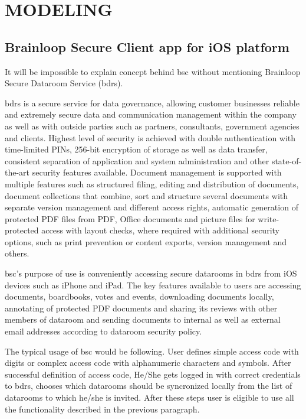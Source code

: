 \chapter{MODELING}
\label{chapter:modeling}


\section{Brainloop Secure Client app for iOS platform} 

\par
It will be impossible to explain concept behind \acrshort{bsc} without mentioning Brainloop Secure Dataroom Service (\acrshort{bdrs}). 

\par
\acrshort{bdrs} \cite{BDRS_Description} is a secure service for data governance, allowing customer businesses reliable and extremely secure data and communication management within the company as well as with outside parties such as partners, consultants, government agencies and clients. Highest level of security is achieved with double authentication with time-limited PINs, 256-bit encryption of storage as well as data transfer, consistent separation of application and system administration and other state-of-the-art security features available. Document management is supported with multiple features such as structured filing, editing and distribution of documents, document collections that combine, sort and structure several documents with separate version management and different access rights, automatic generation of protected PDF files from PDF, Office documents and picture files for write-protected access with layout checks, where required with additional security options, such as print prevention or content exports, version management and others.

\par
\acrshort{bsc}'s \cite{BSC_UserGuide} purpose of use is conveniently accessing secure datarooms in \acrshort{bdrs} from iOS devices such as iPhone and iPad. The key features available to users are accessing documents, boardbooks, votes and events, downloading documents locally, annotating of protected PDF documents and sharing its reviews with other members of dataroom and sending documents to internal as well as external email addresses according to dataroom security policy.

\par
The typical usage of \acrshort{bsc} would be following. User defines simple access code with digits or complex access code with alphanumeric characters and symbols. After successful definition of access code, He/She gets logged in with correct credentials to \acrshort{bdrs}, chooses which datarooms should be syncronized locally from the list of datarooms to which he/she is invited. After these steps user is eligible to use all the functionality described in the previous paragraph.


